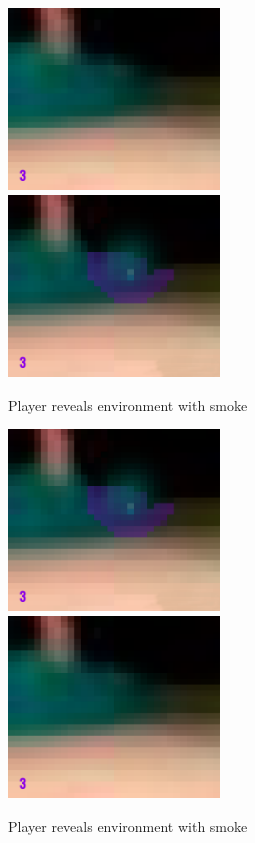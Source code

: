 \begin{figure}
  \centering
  \includegraphics[width=0.5\textwidth, height=0.5\textwidth]{images/game_systems/NoSmoke.png}
  \includegraphics[width=0.5\textwidth, height=0.5\textwidth]{images/game_systems/ThrowSmoke.png}
  \caption{Player reveals environment with smoke}
  \label{SmokeInEnvironment}
\end{figure}

\begin{figure}
  \centering
  \includegraphics[width=0.5\textwidth]{images/game_systems/ThrowSmoke.png}
  \includegraphics[width=0.5\textwidth]{images/game_systems/NoSmoke.png}
  \caption{Player reveals environment with smoke}
  \label{UncoverChamper}
\end{figure}
